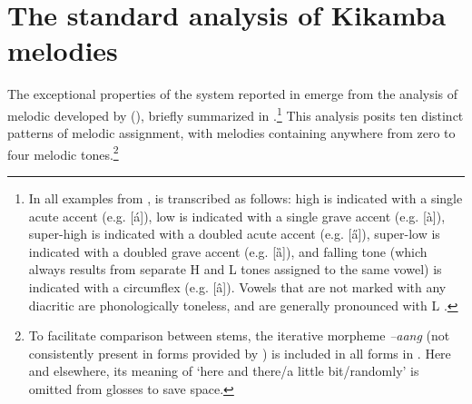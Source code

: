 \documentclass[output=paper,newtxmath,modfonts,nonflat,draft]{langsci/langscibook}
\begin{document}
\section{The standard analysis of Kikamba melodies \citep{Roberts-Kohno2014}}

The exceptional properties of the   system reported in  emerge from the analysis of  melodic  developed by \citeauthor{Roberts-Kohno2000} (\citeyear{Roberts-Kohno2000,Roberts-Kohno2014}), briefly summarized in .\footnote{In all examples from ,  is transcribed as follows: high  is indicated with a single acute accent (e.g. [á]), low  is indicated with a single grave accent (e.g. [à]), super-high  is indicated with a doubled acute accent (e.g. [\H{a}]),  super-low  is indicated with a doubled grave accent (e.g. [ȁ]),
and falling tone (which always results from separate H and L tones assigned to the same vowel) is indicated with a circumflex (e.g. [â]).
Vowels that are not marked with any diacritic are phonologically toneless, and are generally pronounced with L .} This analysis posits ten distinct patterns of melodic  assignment, with melodies containing anywhere from zero to four melodic tones.\footnote{To facilitate comparison between stems, the iterative morpheme \textit{–aang} (not consistently present in forms provided by \citealt{Roberts-Kohno2014}) is included in all forms in . Here and elsewhere, its meaning of ‘here and there/a little bit/randomly’ is omitted from glosses to save space.}
\end{document}
